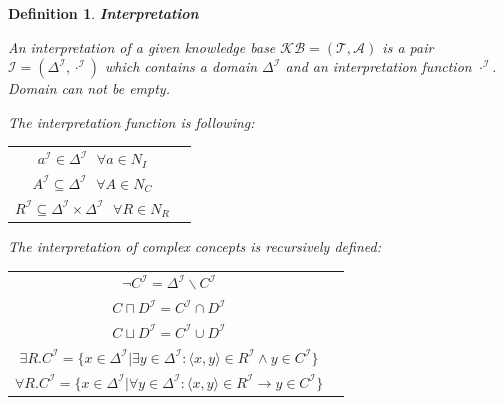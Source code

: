\documentclass[12pt,a4paper]{article}
\newtheorem{definition}{Definition}[subsection]
\begin{document}
\begin{definition}{\textbf{Interpretation}}
	\label{def:interpretation}

	An interpretation of a given knowledge base $\mathcal{KB} = (\mathcal{T}, \mathcal{A})$ is a pair $\mathcal{I} = (\Delta^{\mathcal{I}}, \cdot ^{\mathcal{I}})$ which contains a domain $\Delta^{\mathcal{I}}$ and an interpretation function $\cdot ^{\mathcal{I}}$.	
	Domain can not be empty.
		
	The interpretation function is following:
	
	\begin{table}[H]
		\centering
		\begin{tabular}{c c}
			$ a^{\mathcal{I}} \in \Delta^{\mathcal{I}} \text{ } \forall a \in N_{I} $ \\ \addlinespace[0.4cm]
			 $A^{\mathcal{I}} \subseteq \Delta^{\mathcal{I}} \text{ } \forall A \in N_{C} $ \\
			\addlinespace[0.4cm]
			$ R^{\mathcal{I}} \subseteq \Delta^{\mathcal{I}} \times \Delta^{\mathcal{I}} \text{ } \forall R \in N_{R} $ \\
		\end{tabular}		
	\end{table}

\newpage	
	The interpretation of complex concepts is recursively defined:

	\begin{table}[H]
		\centering
		\begin{tabular}{c c}
			$ \neg C^{\mathcal{I}} = \Delta^{\mathcal{I}} \backslash C^{\mathcal{I}} $ \\ \addlinespace[0.4cm]
			$ C \sqcap D^{\mathcal{I}} = C^{\mathcal{I}} \cap D^{\mathcal{I}} $ \\
			\addlinespace[0.4cm]
			$ C \sqcup D^{\mathcal{I}} = C^{\mathcal{I}} \cup D^{\mathcal{I}} $ \\
			\addlinespace[0.4cm]
			$ \exists R.C^{\mathcal{I}} = \{ x \in \Delta^{\mathcal{I}} | \exists y \in \Delta^{\mathcal{I}} : \langle x,y \rangle \in R^{\mathcal{I}} \land y \in C^{\mathcal{I}} \} $ \\
			\addlinespace[0.4cm]
			$ \forall R.C^{\mathcal{I}} = \{ x \in \Delta^{\mathcal{I}} | \forall y \in \Delta^{\mathcal{I}} : \langle x,y \rangle \in R^{\mathcal{I}} \rightarrow y \in C^{\mathcal{I}} \} $								
		\end{tabular}		
	\end{table}
		
\end{definition}
\end{document}
